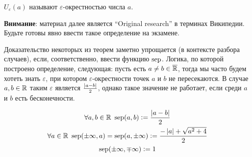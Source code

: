 $U_\varepsilon(a)$ называют $\varepsilon$-окрестностью числа $a$.

\textbf{Внимание}: материал далее является ``Original research'' в терминах Википедии. Будьте готовы явно ввести такое определение на экзамене.

Доказательство некоторых из теорем заметно упрощается (в контексте разбора случаев), если, соответственно, ввести функцию $\operatorname{sep}$. Логика, по которой построено определение, следующая: пусть есть $a \ne b \in \overline{\mathbb{R}}$, тогда мы часто будем хотеть знать $\varepsilon$, при котором $\varepsilon$-окрестности точек $a$ и $b$ не пересекаются. В случае $a, b \in \mathbb{R}$ таким $\varepsilon$ является $\frac{\left\lvert a - b \right\rvert}{2}$, однако такое значение не работает, если среди $a$ и $b$ есть бесконечности.

\begin{equation}
    \begin{gathered}
        \forall a, b \in \mathbb{R}\ \operatorname{sep}(a, b) \vcentcolon= \frac{\left\lvert a - b \right\rvert}{2} \\
        \forall a \in \mathbb{R}\ \operatorname{sep}(\pm\infty, a) = \operatorname{sep}(a, \pm\infty) \vcentcolon= \frac{-\left\lvert a \right\rvert + \sqrt{a^2+4}}{2} \\
        \operatorname{sep}(\pm\infty, \mp\infty) \vcentcolon= 1
    \end{gathered}
    \label{SepDefinition}
\end{equation}

